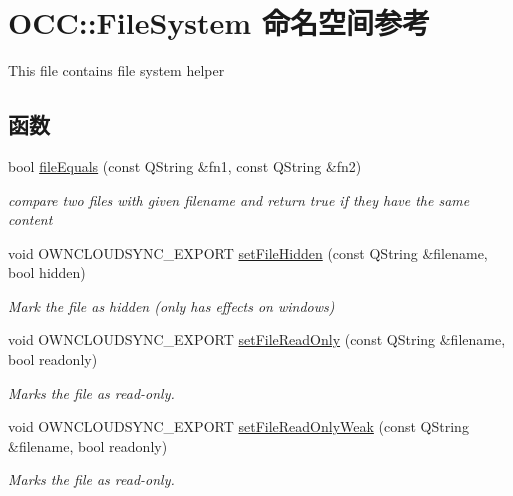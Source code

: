 \hypertarget{namespace_o_c_c_1_1_file_system}{}\section{O\+CC\+:\+:File\+System 命名空间参考}
\label{namespace_o_c_c_1_1_file_system}


This file contains file system helper  


\subsection*{函数}
\begin{DoxyCompactItemize}
\item 
bool \hyperlink{namespace_o_c_c_1_1_file_system_a975974e9353410f28c9c2f280119174b}{file\+Equals} (const Q\+String \&fn1, const Q\+String \&fn2)
\begin{DoxyCompactList}\small\item\em compare two files with given filename and return true if they have the same content \end{DoxyCompactList}\item 
void O\+W\+N\+C\+L\+O\+U\+D\+S\+Y\+N\+C\+\_\+\+E\+X\+P\+O\+RT \hyperlink{namespace_o_c_c_1_1_file_system_a7c843b229f6b4c70bd2b4369d7856db4}{set\+File\+Hidden} (const Q\+String \&filename, bool hidden)
\begin{DoxyCompactList}\small\item\em Mark the file as hidden (only has effects on windows) \end{DoxyCompactList}\item 
void O\+W\+N\+C\+L\+O\+U\+D\+S\+Y\+N\+C\+\_\+\+E\+X\+P\+O\+RT \hyperlink{namespace_o_c_c_1_1_file_system_a875f747aa9ad5b52ab5270aab7d52d46}{set\+File\+Read\+Only} (const Q\+String \&filename, bool readonly)
\begin{DoxyCompactList}\small\item\em Marks the file as read-\/only. \end{DoxyCompactList}\item 
void O\+W\+N\+C\+L\+O\+U\+D\+S\+Y\+N\+C\+\_\+\+E\+X\+P\+O\+RT \hyperlink{namespace_o_c_c_1_1_file_system_a8be889e4d12b3e9d5e27f454e4c55a71}{set\+File\+Read\+Only\+Weak} (const Q\+String \&filename, bool readonly)
\begin{DoxyCompactList}\small\item\em Marks the file as read-\/only. \end{DoxyCompactList}\item 

\end{DoxyCompactItemize}
